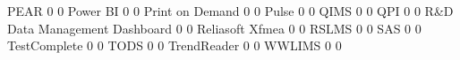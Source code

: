 \documentclass{article}
\begin{document}
\begin{Schunk}
\begin{Soutput}
  PEAR                                                    0                  0
  Power BI                                                0                  0
  Print on Demand                                         0                  0
  Pulse                                                   0                  0
  QIMS                                                    0                  0
  QPI                                                     0                  0
  R&D Data Management Dashboard                           0                  0
  Reliasoft Xfmea                                         0                  0
  RSLMS                                                   0                  0
  SAS                                                     0                  0
  TestComplete                                            0                  0
  TODS                                                    0                  0
  TrendReader                                             0                  0
  WWLIMS                                                  0                  0
                                          

\end{Soutput}
\end{Schunk}
\end{document}
